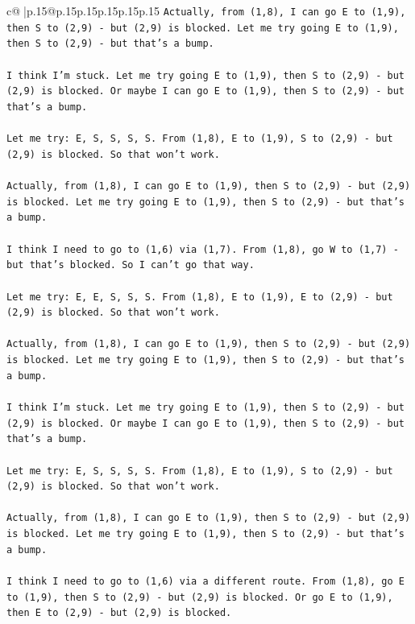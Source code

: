 \documentclass{article}
\begin{document}
{\begin{supertabular}{c@{$\;$}|p{.15\linewidth}@{}p{.15\linewidth}p{.15\linewidth}p{.15\linewidth}p{.15\linewidth}p{.15\linewidth}}
{{{\texttt{Actually, from (1,8), I can go E to (1,9), then S to (2,9) {-} but (2,9) is blocked. Let me try going E to (1,9), then S to (2,9) {-} but that's a bump.} \\
\\ 
\texttt{I think I'm stuck. Let me try going E to (1,9), then S to (2,9) {-} but (2,9) is blocked. Or maybe I can go E to (1,9), then S to (2,9) {-} but that's a bump.} \\
\\ 
\texttt{Let me try: E, S, S, S, S. From (1,8), E to (1,9), S to (2,9) {-} but (2,9) is blocked. So that won't work.} \\
\\ 
\texttt{Actually, from (1,8), I can go E to (1,9), then S to (2,9) {-} but (2,9) is blocked. Let me try going E to (1,9), then S to (2,9) {-} but that's a bump.} \\
\\ 
\texttt{I think I need to go to (1,6) via (1,7). From (1,8), go W to (1,7) {-} but that's blocked. So I can't go that way.} \\
\\ 
\texttt{Let me try: E, E, S, S, S. From (1,8), E to (1,9), E to (2,9) {-} but (2,9) is blocked. So that won't work.} \\
\\ 
\texttt{Actually, from (1,8), I can go E to (1,9), then S to (2,9) {-} but (2,9) is blocked. Let me try going E to (1,9), then S to (2,9) {-} but that's a bump.} \\
\\ 
\texttt{I think I'm stuck. Let me try going E to (1,9), then S to (2,9) {-} but (2,9) is blocked. Or maybe I can go E to (1,9), then S to (2,9) {-} but that's a bump.} \\
\\ 
\texttt{Let me try: E, S, S, S, S. From (1,8), E to (1,9), S to (2,9) {-} but (2,9) is blocked. So that won't work.} \\
\\ 
\texttt{Actually, from (1,8), I can go E to (1,9), then S to (2,9) {-} but (2,9) is blocked. Let me try going E to (1,9), then S to (2,9) {-} but that's a bump.} \\
\\ 
\texttt{I think I need to go to (1,6) via a different route. From (1,8), go E to (1,9), then S to (2,9) {-} but (2,9) is blocked. Or go E to (1,9), then E to (2,9) {-} but (2,9) is blocked.} \\
\\ 
}}}
\end{supertabular}}
\end{document}
